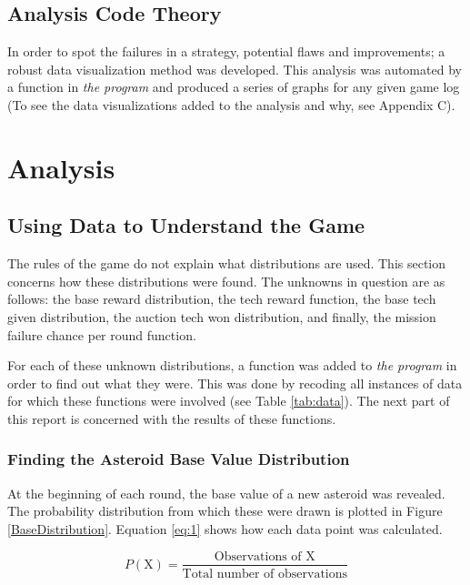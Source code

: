 \documentclass[11pt, twoside]{article}
\begin{document}
\subsection{Analysis Code Theory}
In order to spot the failures in a strategy, potential flaws and improvements; a robust data visualization method was developed. This analysis was automated by a function in \textit{the program} and produced a series of graphs for any given game log (To see the data visualizations added to the analysis and why, see Appendix C).

\newpage

\section{Analysis} \label{Section3}

\subsection{Using Data to Understand the Game} \label{sec:analysis1}

The rules of the game do not explain what distributions are used. This section concerns how these distributions were found. The unknowns in question are as follows: the base reward distribution, the tech reward function, the base tech given distribution, the auction tech won distribution, and finally, the mission failure chance per round function.

 For each of these unknown distributions, a function was added to \textit{the program} in order to find out what they were. This was done by recoding all instances of data for which these functions were involved (see Table \ref{tab:data}). The next part of this report is concerned with the results of these functions.

\subsubsection*{Finding the Asteroid Base Value Distribution}
At the beginning of each round, the base value of a new asteroid was revealed. The probability distribution from which these were drawn is plotted in Figure \ref{BaseDistribution}. Equation \ref{eq:1} shows how each data point was calculated.

\begin{equation}
\label{eq:1}
P(\text{X}) = \dfrac{\text{Observations of X}}{\text{Total number of observations}}
\end{equation}
\end{document}
